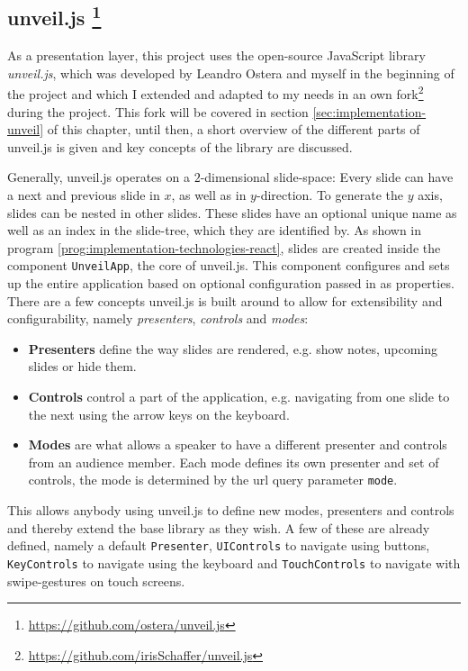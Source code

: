 \subsection[unveil.js]%
             {unveil.js%
             \protect\footnote{\url{https://github.com/ostera/unveil.js}}}    
\label{sec:implementation-technologies-unveil}

As a presentation layer, this project uses the open-source JavaScript library \textit{unveil.js}, which was developed by Leandro Ostera and myself in the beginning of the project and which I extended and adapted to my needs in an own fork\footnote{\url{https://github.com/irisSchaffer/unveil.js}} during the project. This fork will be covered in section \ref{sec:implementation-unveil} of this chapter, until then, a short overview of the different parts of unveil.js is given and key concepts of the library are discussed.

Generally, unveil.js operates on a $2$-dimensional slide-space: Every slide can have a next and previous slide in $x$, as well as in $y$-direction. To generate the $y$ axis, slides can be nested in other slides. These slides have an optional unique name as well as an index in the slide-tree, which they are identified by. As shown in program \ref{prog:implementation-technologies-react}, slides are created inside the component \texttt{UnveilApp}, the core of unveil.js. This component configures and sets up the entire application based on optional configuration passed in as properties.
There are a few concepts unveil.js is built around to allow for extensibility and configurability, namely \emph{presenters}, \emph{controls} and \emph{modes}:
%
\begin{itemize}
\item \textbf{Presenters} define the way slides are rendered, e.g. show notes, upcoming slides or hide them.
\item \textbf{Controls} control a part of the application, e.g. navigating from one slide to the next using the arrow keys on the keyboard.
\item \textbf{Modes} are what allows a speaker to have a different presenter and controls from an audience member. Each mode defines its own presenter and set of controls, the mode is determined by the url query parameter \texttt{mode}.
\end{itemize}
This allows anybody using unveil.js to define new modes, presenters and controls and thereby extend the base library as they wish. A few of these are already defined, namely a default \texttt{Presenter}, \texttt{UIControls} to navigate using buttons, \texttt{KeyControls} to navigate using the keyboard and \texttt{TouchControls} to navigate with swipe-gestures on touch screens.

